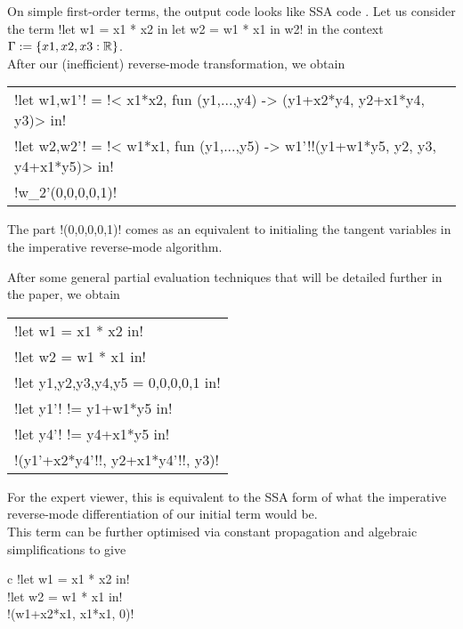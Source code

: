 \begin{example}
On simple first-order terms, the output code looks like SSA code \cite{cytron1989efficient}.
Let us consider  the term !let w1 = x1 * x2 in let w2 = w1 * x1 in w2! in the context $\Gamma:=\{x1,x2,x3:\mathbb{R}\}$.\\
After our (inefficient) reverse-mode transformation, we obtain
\begin{center}
    \begin{tabular}{l}
        !let w1,w1'! = !< x1*x2, fun (y1,...,y4) -> (y1+x2*y4, y2+x1*y4, y3)> in!\\
        !let w2,w2'! = !< w1*x1, fun (y1,...,y5) -> w1'!!(y1+w1*y5, y2, y3, y4+x1*y5)> in!\\
        !w_2'(0,0,0,0,1)!
    \end{tabular}
\end{center}
The part !(0,0,0,0,1)! comes as an equivalent to initialing the tangent variables in the imperative reverse-mode algorithm. 

After some general partial evaluation techniques that will be detailed further in the paper, we obtain     

    \begin{center}
            \begin{tabular}{l}
                !let w1 = x1 * x2 in!\\ 
                !let w2 = w1 * x1 in!\\
                !let y1,y2,y3,y4,y5 = 0,0,0,0,1 in!\\
                !let y1'! != y1+w1*y5 in!\\
                !let y4'! != y4+x1*y5 in!\\
                !(y1'+x2*y4'!!, y2+x1*y4'!!, y3)!
            \end{tabular}
    \end{center}   
For the expert viewer, this is equivalent to the SSA form \cite{cytron1989efficient} of what the imperative reverse-mode differentiation of our initial term would be.\\
This term can be further optimised via constant propagation and algebraic simplifications to give
        \begin{center}
            \begin{tabular}{{c}}
                !let w1 = x1 * x2 in!\\ 
                !let w2 = w1 * x1 in!\\
                !(w1+x2*x1, x1*x1, 0)!
            \end{tabular}
        \end{center}
    \end{example}

